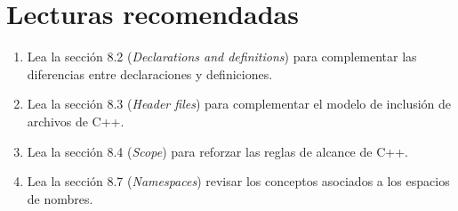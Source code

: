 \section{Lecturas recomendadas}

\begin{enumerate}

\item Lea la sección 8.2 (\emph{Declarations and definitions}) para complementar
      las diferencias entre declaraciones y definiciones.

\item Lea la sección 8.3 (\emph{Header files}) para complementar el modelo
      de inclusión de archivos de C++.

\item Lea la sección 8.4 (\emph{Scope}) para reforzar las reglas de alcance de C++.

\item Lea la sección 8.7 (\emph{Namespaces}) revisar los conceptos asociados
      a los espacios de nombres.

\end{enumerate}
